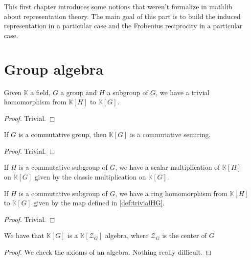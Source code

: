 This first chapter introduces some notions that weren't formalize in
mathlib about representation theory. The main goal of this part is to build
the induced representation in a particular case and the Frobenius reciprocity
in a particular case.

\section{Group algebra}


\begin{definition}
    \label{def:trivialkHkG}
    \uses{}
    \leanok
    Given $\mathbb{K}$ a field, $G$ a group and $H$ a subgroup of $G$, 
    we have a trivial homomorphism from $\mathbb{K}[H]$ to $\mathbb{K}[G]$.
    \begin{proof}
        \leanok
        Trivial.
    \end{proof}
\end{definition}


\begin{proposition}
    \label{prop:KGcommsemiring}
    \uses{}
    \leanok
    If $G$ is a commutative group, then $\mathbb{K}[G]$ is a commutative semiring.
\end{proposition}
\begin{proof}
    \leanok
    Trivial.
\end{proof}

\begin{definition}
    \label{prop:KHKGsmul}
    \leanok
    If $H$ is a commutative subgroup of $G$, we have a scalar multiplication
    of $\mathbb{K}[H]$ on $\mathbb{K}[G]$ given by the classic multiplication
    on $\mathbb{K}[G]$.
\end{definition}

\begin{definition}
    \label{def:RingHomkHkG}
    \leanok
    If $H$ is a commutative subgroup of $G$, we have a ring homomorphism
    from $\mathbb{K}[H]$ to $\mathbb{K}[G]$ given by the map defined in \ref{def:trivialHG}.
\end{definition}
\begin{proof}
    \leanok
    Trivial.
\end{proof}

\begin{proposition}
    \label{prop:kG_is_kGcenter_Algebra}
    \leanok
    We have that $\mathbb{K}[G]$ is a $\mathbb{K}[\mathcal{Z}_G]$
    algebra, where $\mathcal{Z}_G$ is the center of $G$
\end{proposition}
\begin{proof}
    \leanok
    We check the axioms of an algebra. Nothing really difficult.
\end{proof}

